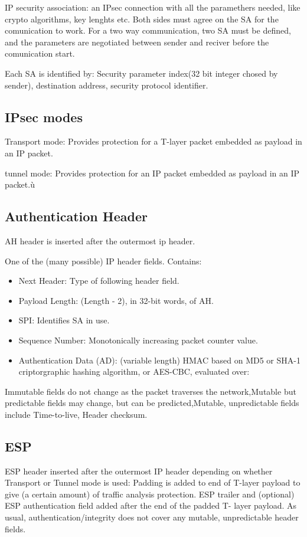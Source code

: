 IP security association: an IPsec connection with all the paramethers needed, like crypto algorithms, key lenghts etc. Both sides
must agree on the SA for the comunication to work. For a two way communication, two SA must be defined, and the parameters
are negotiated between sender and reciver before the comunication start.

Each SA is identified by: Security parameter index(32 bit integer chosed by sender), destination address, security protocol identifier.

\subsection{IPsec modes}
Transport mode: Provides protection for a T-layer packet embedded as payload in an IP packet.

tunnel mode: Provides protection for an IP packet embedded as payload in an IP packet.ù

\subsection{Authentication Header}
AH header is inserted after the outermost ip header.

One of the (many possible) IP header fields. Contains:
\begin{itemize}
    \item Next Header: Type of following header field.
    \item Payload Length: (Length - 2), in 32-bit words, of AH.
    \item SPI: Identifies SA in use.
    \item Sequence Number: Monotonically increasing packet counter value.
    \item Authentication Data (AD): (variable length) HMAC based on MD5 or SHA-1 criptorgraphic hashing
algorithm, or AES-CBC, evaluated over:
\end{itemize}

Immutable fields do not change as the packet traverses the network,Mutable but predictable fields may change, but can be predicted,Mutable, unpredictable fields include Time-to-live, Header checksum.

\subsection{ESP}
ESP header inserted after the outermost IP header depending on whether Transport or
Tunnel mode is used:
Padding is added to end of T-layer payload to give (a certain amount) of traffic analysis
protection. ESP trailer and (optional) ESP authentication field added after the end of the padded T-
layer payload.
As usual, authentication/integrity does not cover any mutable, unpredictable header fields.

